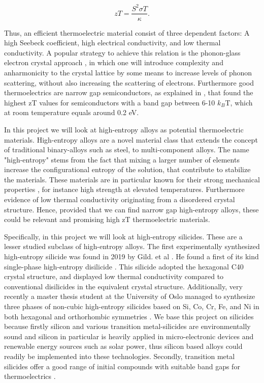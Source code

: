 \documentclass[UKenglish]{ifimaster}  %
\begin{document}
\begin{equation}
zT = \frac{S^2\sigma T}{\kappa}. 
\end{equation}

Thus, an efficient thermoelectric material consist of three dependent factors: A high Seebeck coefficient, high electrical conductivity, and low thermal conductivity. A popular strategy to achieve this relation is the phonon-glass electron crystal approach \cite{SnyderG.Jeffrey2008Ctm}, in which one will introduce complexity and anharmonicity to the crystal lattice by some means to increase levels of phonon scattering, without also increasing the scattering of electrons. Furthermore good thermoelectrics are narrow gap semiconductors, as explained in \cite{TE_gap}, that found the highest zT values for semiconductors with a band gap between 6-10 $k_B$T, which at room temperature equals around 0.2 eV.   

In this project we will look at high-entropy alloys as potential thermoelectric materials. High-entropy alloys are a novel material class that extends the concept of traditional binary-alloys such as steel, to multi-component alloys. The name "high-entropy" stems from the fact that mixing a larger number of elements increase the configurational entropy of the solution, that contribute to stabilize the materials. These materials are in particular known for their strong mechanical properties \cite{hea}, for instance high strength at elevated temperatures. Furthermore evidence of low thermal conductivity originating from a disordered crystal structure. Hence, provided that we can find narrow gap high-entropy alloys, these could be relevant and promising high zT thermoelectric materials.  

Specifically, in this project we will look at high-entropy silicides. These are a lesser studied subclass of high-entropy alloys. The first experimentally synthesized high-entropy silicide was found in 2019 by Gild. et al \cite{GILD2019337}. He found a first of its kind single-phase high-entropy disilicide . This silicide adopted the hexagonal C40 crystal structure, and displayed low thermal conductivity compared to conventional disilicides in the equivalent crystal structure. Additionally, very recently a master thesis student at the University of Oslo managed to synthesize three phases of non-cubic high-entropy silicides based on Si, Co, Cr, Fe, and Ni in both hexagonal and orthorhombic symmetries \cite{mari}.  We base this project on silicides because firstly silicon and various transition metal-silicides are environmentally sound and silicon in particular is heavily applied in micro-electronic devices and renewable energy sources such as solar power, thus silicon based alloys could readily be implemented into these technologies. Secondly, transition metal silicides offer a good range of initial compounds with suitable band gaps for thermoelectrics \cite{silicde}.   
\end{document}
